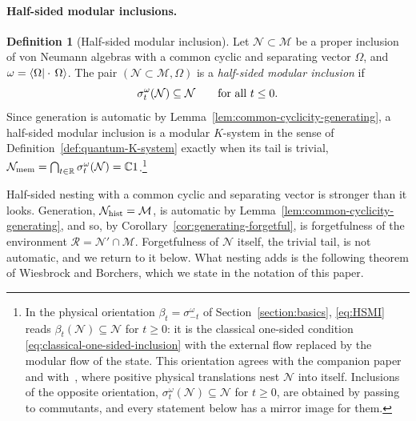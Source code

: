 \documentclass[a4paper,11pt]{article}
\theoremstyle{definition}
\newtheorem{definition}{Definition}[section]
\begin{document}
\paragraph{Half-sided modular inclusions.}
\begin{definition}[Half-sided modular inclusion]\label{def:modular-K}\label{def:HSMI}
Let $\mathcal N\subset\mathcal M$ be a proper inclusion of von Neumann algebras with a common cyclic and separating vector $\Omega$, and $\omega=\braket{\Omega|\cdot\,\Omega}$. The pair $(\mathcal N\subset\mathcal M,\Omega)$ is a \emph{half-sided modular inclusion} if
\begin{equation}
 \sigma^{\omega}_t(\mathcal N)\subseteq\mathcal N\qquad\hbox{for all } t\le0 .
 \label{eq:HSMI}
\end{equation}
Since generation is automatic by Lemma~\ref{lem:common-cyclicity-generating}, a half-sided modular inclusion is a modular $K$-system in the sense of Definition~\ref{def:quantum-K-system} exactly when its tail is trivial, $\mathcal N_{\rm mem}=\bigcap_{t\in\mathbb R}\sigma^\omega_t(\mathcal N)=\mathbb C1$.\footnote{In the physical orientation $\beta_t=\sigma^\omega_{-t}$ of Section~\ref{section:basics}, \eqref{eq:HSMI} reads $\beta_t(\mathcal N)\subseteq\mathcal N$ for $t\ge0$: it is the classical one-sided condition \eqref{eq:classical-one-sided-inclusion} with the external flow replaced by the modular flow of the state. This orientation agrees with the companion paper and with~\cite{Wiesbrock1993,revolutionizing}, where positive physical translations nest $\mathcal N$ into itself. Inclusions of the opposite orientation, $\sigma^\omega_t(\mathcal N)\subseteq\mathcal N$ for $t\ge0$, are obtained by passing to commutants, and every statement below has a mirror image for them.}
\end{definition}

Half-sided nesting with a common cyclic and separating vector is stronger than it looks. Generation, $\mathcal N_{\rm hist}=\mathcal M$, is automatic by Lemma~\ref{lem:common-cyclicity-generating}, and so, by Corollary~\ref{cor:generating-forgetful}, is forgetfulness of the environment $\mathcal R=\mathcal N'\cap\mathcal M$. Forgetfulness of $\mathcal N$ itself, the trivial tail, is not automatic, and we return to it below. What nesting adds is the following theorem of Wiesbrock and Borchers, which we state in the notation of this paper.
\end{document}
